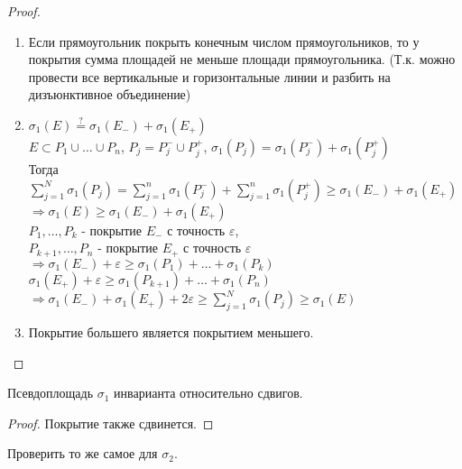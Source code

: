 \begin{proof}
    \begin{enumerate}
        \item Если прямоугольник покрыть конечным числом прямоугольников, то у покрытия сумма площадей не меньше площади прямоугольника.
        (Т.к. можно провести все вертикальные и горизонтальные линии и разбить на дизъюнктивное объединение)

        \item 
        $\sigma_1(E) \stackrel{?}{=} \sigma_1(E_-) + \sigma_1(E_+)$ \\
        \circled{$\geq$} $E \subset P_1 \cup \ldots \cup P_n$,  $P_j = P_j^- \cup P_j^+$,  $\sigma_1(P_j) = \sigma_1(P_j^-) + \sigma_1(P_j^+)$ \\
        Тогда $\sum\limits_{j=1}^N \sigma_1(P_j) = \sum\limits_{j=1}^n \sigma_1(P_j^-) + \sum\limits_{j=1}^n \sigma_1(P_j^+) \geq \sigma_1(E_-) + \sigma_1(E_+)$ \\
        $\Rightarrow \sigma_1(E) \geq \sigma_1(E_-) + \sigma_1(E_+)$ \\
        
        \circled{$\leq$} $P_1, \ldots, P_k$ - покрытие $E_-$ с точность $\varepsilon$,  \\
        $P_{k + 1}, \ldots, P_n$ - покрытие $E_+$ с точность $\varepsilon$ \\
        $\Rightarrow \sigma_1(E_-) + \varepsilon \geq \sigma_1(P_1) + \ldots + \sigma_1(P_k)$ \\
        $\sigma_1(E_+) + \varepsilon \geq \sigma_1(P_{k + 1}) + \ldots + \sigma_1(P_n)$ \\
        $\Rightarrow \sigma_1(E_-) + \sigma_1(E_+) + 2\varepsilon \geq \sum\limits_{j = 1}^N \sigma_1(P_j) \geq \sigma_1(E)$

        \item Покрытие большего является покрытием меньшего.
        
         
    \end{enumerate}
\end{proof}

\begin{theorem}
    Псевдоплощадь $\sigma_1$ инварианта относительно сдвигов.
\end{theorem}

\begin{proof}
    Покрытие также сдвинется.
\end{proof}

\begin{remark}
    Проверить то же самое для $\sigma_2$.
\end{remark}



